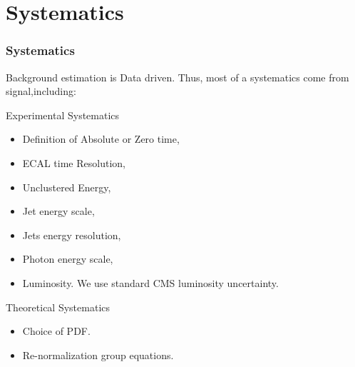 \documentclass{beamer}
\begin{document}
\section{Systematics}
\begin{frame}
\frametitle{\Huge Systematics}
 \begin{minipage}[t]{0.8\linewidth}
  Background estimation is Data driven.
  Thus, most of a systematics come from signal,including:
  \begin{varblock}[7cm]{Experimental Systematics}
   \begin{itemize}
    \item Definition of Absolute or Zero time,
    \item ECAL time Resolution,    
    \item Unclustered Energy,
    \item Jet energy scale,
    \item Jets energy resolution,
    \item Photon energy scale,
    \item Luminosity. We use standard CMS luminosity uncertainty.
   \end{itemize}
  \end{varblock}  
  \begin{varblock}[7cm]{Theoretical Systematics}
   \begin{itemize}   
   \item Choice of PDF.
   \item Re-normalization group equations.
   \end{itemize}
  \end{varblock} 
\end{minipage}
\end{frame}
\end{document}
